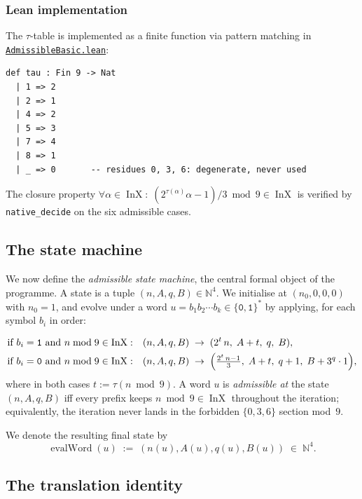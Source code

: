 \documentclass[11pt,a4paper]{article}
\theoremstyle{plain}
\theoremstyle{definition}
\newcommand{\NN}{\mathbb{N}}
\DeclareMathOperator{\InX}{InX}
\DeclareMathOperator{\evalWord}{evalWord}
\begin{document}
\subsubsection*{Lean implementation}

The $\tau$-table is implemented as a finite function via pattern
matching in
\href{run:CollatzLean4/CollatzLean4/AdmissibleBasic.lean}%
{\texttt{AdmissibleBasic.lean}}:

\begin{lstlisting}
def tau : Fin 9 -> Nat
  | 1 => 2
  | 2 => 1
  | 4 => 2
  | 5 => 3
  | 7 => 4
  | 8 => 1
  | _ => 0       -- residues 0, 3, 6: degenerate, never used
\end{lstlisting}

The closure property
$\forall \alpha \in \InX:\; (2^{\tau(\alpha)} \alpha - 1) / 3 \bmod 9 \in \InX$
is verified by \texttt{native\_decide} on the six admissible cases.

\subsection{The state machine}

We now define the \emph{admissible state machine}, the central
formal object of the programme. A state is a tuple
$(n, A, q, B) \in \NN^4$. We initialise at $(n_0, 0, 0, 0)$ with
$n_0 = 1$, and evolve under a word
$u = b_1 b_2 \cdots b_k \in \{\mathtt{0}, \mathtt{1}\}^*$ by
applying, for each symbol $b_i$ in order:

\begin{align*}
  \text{if } b_i = \mathtt{1} \text{ and } n \bmod 9 \in \InX: &\quad
    (n, A, q, B) \;\to\; (2^t \, n,\; A + t,\; q,\; B), \\
  \text{if } b_i = \mathtt{0} \text{ and } n \bmod 9 \in \InX: &\quad
    (n, A, q, B) \;\to\;
       \Bigl(\tfrac{2^t \, n - 1}{3},\; A + t,\; q + 1,\; B + 3^q \cdot 1 \Bigr),
\end{align*}
where in both cases $t := \tau(n \bmod 9)$. A word $u$ is
\emph{admissible at} the state $(n, A, q, B)$ iff every prefix
keeps $n \bmod 9 \in \InX$ throughout the iteration; equivalently,
the iteration never lands in the forbidden $\{0, 3, 6\}$ section
mod~$9$.

We denote the resulting final state by
\[
   \evalWord(u) \;:=\; (n(u), A(u), q(u), B(u)) \;\in\; \NN^4.
\]

\subsection{The translation identity}
\end{document}
